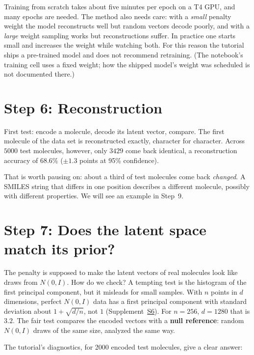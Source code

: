 \documentclass[11pt]{article}
\begin{document}
Training from scratch takes about five minutes per epoch on a T4 GPU, and many epochs are needed. The method also needs care: with a \emph{small} penalty weight the model reconstructs well but random vectors decode poorly, and with a \emph{large} weight sampling works but reconstructions suffer. In practice one starts small and increases the weight while watching both. For this reason the tutorial ships a pre-trained model and does not recommend retraining. (The notebook's training cell uses a fixed weight; how the shipped model's weight was scheduled is not documented there.)

\section{Step 6: Reconstruction}
First test: encode a molecule, decode its latent vector, compare. The first molecule of the data set is reconstructed exactly, character for character. Across $5000$ test molecules, however, only $3429$ come back identical, a reconstruction accuracy of $\mathbf{68.6\%}$ ($\pm1.3$ points at 95\% confidence).

That is worth pausing on: about a third of test molecules come back \emph{changed}. A SMILES string that differs in one position describes a different molecule, possibly with different properties. We will see an example in Step~9.

\section{Step 7: Does the latent space match its prior?}
The penalty is supposed to make the latent vectors of real molecules look like draws from $N(0,I)$. How do we check? A tempting test is the histogram of the first principal component, but it misleads for small samples. With $n$ points in $d$ dimensions, perfect $N(0,I)$ data has a first principal component with standard deviation about $1+\sqrt{d/n}$, not $1$ (Supplement~\hyperref[sec:S6]{S6}). For $n=256$, $d=1280$ that is $3.2$. The fair test compares the encoded vectors with a \textbf{null reference}: random $N(0,I)$ draws of the same size, analyzed the same way.

The tutorial's diagnostics, for 2000 encoded test molecules, give a clear answer:
\end{document}
